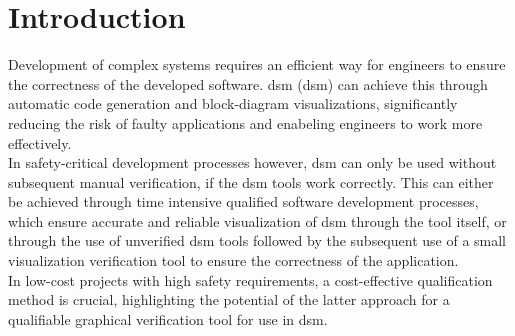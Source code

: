 \chapter{Introduction}
\label{chp:introduction}

Development of complex systems requires an efficient way for engineers to ensure the correctness of the developed software. \acrlong{dsm} (\acrshort{dsm}) can achieve this through automatic code generation and block-diagram visualizations, significantly reducing the risk of faulty applications and enabeling engineers to work more effectively.\\
In safety-critical development processes however, \acrshort{dsm} can only be used without subsequent manual verification, if the \acrshort{dsm} tools work correctly. This can either be achieved through time intensive qualified software development processes, which ensure accurate and reliable visualization of \acrshort{dsm} through the tool itself, or through the use of unverified \acrshort{dsm} tools followed by the subsequent use of a small visualization verification tool to ensure the correctness of the application.\\
In low-cost projects with high safety requirements, a cost-effective qualification method is crucial, highlighting the potential of the latter approach for a qualifiable graphical verification tool for use in \acrshort{dsm}.

